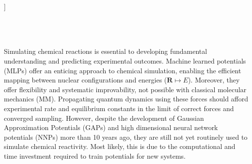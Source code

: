 \documentclass[twoside,twocolumn,9pt]{article}
\begin{document}
  ]

\renewcommand*\rmdefault{bch}\normalfont\upshape
\rmfamily
\section*{}
\vspace{-1cm}








\\%


\rmfamily %




Simulating chemical reactions is essential to developing fundamental understanding and predicting experimental outcomes.\cite{Orr-Ewing2017} Machine learned potentials (MLPs) offer an enticing approach to chemical simulation, enabling the efficient mapping between nuclear configurations and energies ($\boldsymbol{R} \mapsto E$). Moreover, they offer flexibility and systematic improvability, not possible with classical molecular mechanics (MM).\cite{Behler2016} Propagating quantum dynamics using these forces should afford experimental rate and equilibrium constants in the limit of correct forces and converged sampling. However, despite the development of Gaussian Approximation Potentials (GAPs)\cite{Bartk2010, Deringer2021} and high dimensional neural network potentials (NNPs)\cite{Behler2007} more than 10 years ago, they are still not yet routinely used to simulate chemical reactivity.\cite{Ko2020} Most likely, this is due to the computational and time investment required to train potentials for new systems. 
\end{document}

